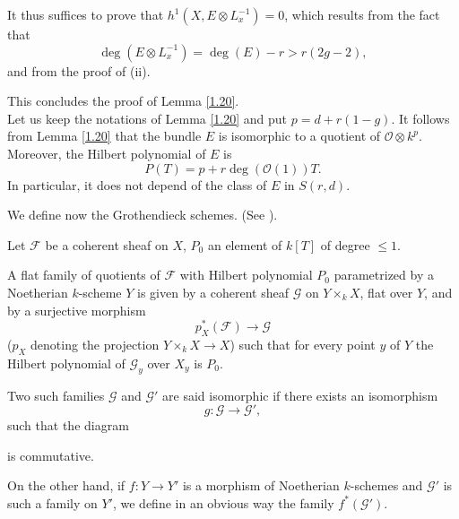 \documentclass[12pt,a4paper]{book}
\def\FF{\mathscr{F}}
\def\GG{\mathscr{G}}
\def\OO{\mathscr{O}}
\theoremstyle{definition} \newtheorem{defn}[thm]{Definition}
\theoremstyle{definition} \newtheorem{ejs}[thm]{Examples}
\theoremstyle{definition} \newtheorem{ej}[thm]{Example}
\begin{document}
   It thus suffices to prove that $h^1(X,E\otimes L_x^{-1})=0$, which results from the fact that
   \begin{equation*}
     \deg(E\otimes L_x^{-1}) = \deg (E) -r > r(2g-2),
   \end{equation*}
   and from the proof of (ii).

   This concludes the proof of Lemma \ref{1.20}. \\
   
   Let us keep the notations of Lemma \ref{1.20} and put $p=d+r(1-g)$. It follows from Lemma \ref{1.20} that the bundle $E$ is isomorphic to a quotient of $\OO\otimes k^p$. Moreover, the Hilbert polynomial of $E$ is
   \begin{equation*}
     P(T)=p+r\deg(\OO(1)) T.
   \end{equation*}
   In particular, it does not depend of the class of $E$ in $S(r,d)$.
  
   We define now the Grothendieck schemes. (See \cite{7}).

   Let $\FF$ be a coherent sheaf on $X$, $P_0$ an element of $k[T]$ of degree $\leq 1$. 

   A flat family of quotients of $\FF$ with Hilbert polynomial $P_0$ parametrized by a Noetherian $k$-scheme $Y$ is given by a coherent sheaf $\GG$ on $Y\times_k X$, flat over $Y$, and by a surjective morphism
   \begin{equation*}
     p_X^*(\FF) \longrightarrow \GG
   \end{equation*}
   ($p_X$ denoting the projection $Y\times_k X \rightarrow X$) such that for every point $y$ of $Y$ the Hilbert polynomial of $\GG_y$ over $X_y$ is $P_0$. 

   Two such families $\GG$ and $\GG'$ are said isomorphic if there exists an isomorphism
   \begin{equation*}
     g: \GG \longrightarrow \GG',
   \end{equation*}
   such that the diagram
   \begin{center}
   \end{center}
   is commutative.

   On the other hand, if $f:Y\rightarrow Y'$ is a morphism of Noetherian $k$-schemes and $\GG'$ is such a family on $Y'$, we define in an obvious way the family $f^*(\GG')$. 
\end{document}
